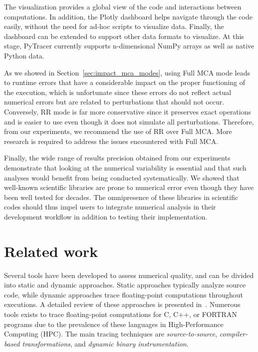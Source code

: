 \documentclass[10pt,journal,compsoc]{IEEEtran}
\newcommand{\pytracer}[0]{PyTracer\xspace}
\begin{document}
The visualization provides a global view of the code and interactions between
computations. In addition, the Plotly dashboard helps navigate through the code
easily, without the need for ad-hoc scripts to visualize data. Finally, the
dashboard can be extended to support other data formats to visualize. At this
stage, \pytracer currently supports n-dimensional NumPy arrays as well as native
Python data. 

As we showed in Section~\ref{sec:impact_mca_modes}, using Full MCA mode leads to
runtime errors that have a considerable impact on the proper functioning of the
execution, which is unfortunate since these errors do not reflect actual
numerical errors but are related to perturbations that should not occur.
Conversely, RR mode is far more conservative since it preserves exact operations
and is easier to use even though it does not simulate all perturbations.
Therefore, from our experiments, we recommend the use of RR over Full MCA. More
research is required to address the issues encountered with Full MCA. 

Finally, the wide range of results precision obtained from our experiments
demonstrate that looking at the numerical variability is essential and that such
analyses would benefit from being conducted systematically. We showed that
well-known scientific libraries are prone to numerical error even though they
have been well tested for decades. The omnipresence of these libraries in
scientific codes should thus impel users to integrate numerical analysis in
their development workflow in addition to testing their implementation.

\section{Related work}

Several tools have been developed to assess numerical quality, and can be
divided into static and dynamic approaches. Static approaches typically analyze
source code, while dynamic approaches trace floating-point computations
throughout executions. A detailed review of these approaches is presented
in~\cite{cherubin2020tools}. 
Numerous tools exists to trace floating-point computations for C, C++, or
FORTRAN programs due to the prevalence of these languages in High-Performance
Computing (HPC). The main tracing techniques are \textit{source-to-source},
\textit{compiler-based transformations}, and \textit{dynamic binary
    instrumentation}.
\end{document}
